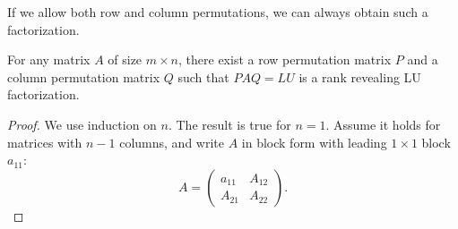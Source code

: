 \documentclass[10pt,twoside]{siamart1116}
\newcommand{\by}{\times}
\numberwithin{theorem}{section}
\begin{document}
If we allow both row and column permutations, we can always obtain such a factorization.

\begin{theorem}\label{thm:row_column_permutation}
  For any matrix $A$ of size $m \by n$, there exist a row permutation matrix $P$ and a column permutation matrix $Q$ such that $PAQ = LU$ is a rank revealing LU factorization.
\end{theorem}

\begin{proof}
  We use induction on $n$. The result is true for $n=1$. Assume it holds for matrices with $n-1$ columns, and write $A$ in block form with leading $1 \times 1$ block $a_{11}$:
  \[
    A =
    \begin{pmatrix}
      a_{11} & A_{12} \\
      A_{21} & A_{22}
    \end{pmatrix}.
  \]


\end{proof}
\end{document}
